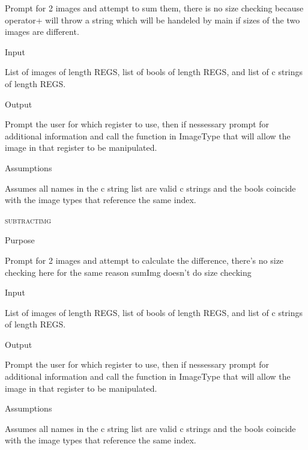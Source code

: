 \documentclass[pdftex, 11pt]{article}
\begin{document}
\begin{description}
\begin{description}
				Prompt for 2 images and attempt to sum them, there is no size checking because
				operator+ will throw a string which will be handeled by main if sizes of the
				two images are different.

			\item{Input}

				List of images of length REGS, list of bools of length
				REGS, and list of c strings of length REGS.

			\item{Output}

				Prompt the user for which register to use, then if nessessary
				prompt for additional information and call the function
				in ImageType that will allow the image in that register to
				be manipulated.

			\item{Assumptions}

				Assumes all names in the c string list are valid c
				strings and the bools coincide with the image types that
				reference the same index.

		\end{description}



	\item{\textsc{subtractimg}}
		\begin{description}
			\item{Purpose}

				Prompt for 2 images and attempt to calculate the difference, there's no size
				checking here for the same reason sumImg doesn't do size checking

			\item{Input}

				List of images of length REGS, list of bools of length
				REGS, and list of c strings of length REGS.

			\item{Output}

				Prompt the user for which register to use, then if nessessary
				prompt for additional information and call the function
				in ImageType that will allow the image in that register to
				be manipulated.

			\item{Assumptions}

				Assumes all names in the c string list are valid c
				strings and the bools coincide with the image types that
				reference the same index.

		\end{description}




\end{description}
\end{document}

